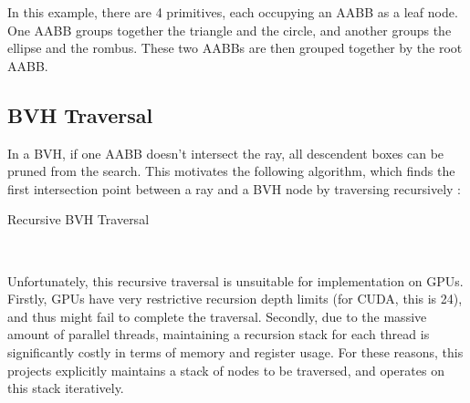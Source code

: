 In this example, there are 4 primitives, each occupying an AABB as a leaf node. One AABB groups together the triangle and the circle, and another groups the ellipse and the rombus. These two AABBs are then grouped together by the root AABB.


\subsection{BVH Traversal}
In a BVH, if one AABB doesn't intersect the ray, all descendent boxes can be pruned from the search. This motivates the following algorithm, which finds the first intersection point between a ray and a BVH node by traversing recursively :

\begin{algorithm}[H]
    \label{algo bvh traversal recursive}
    \caption{Recursive BVH Traversal}
\end{algorithm} 

~

Unfortunately, this recursive traversal is unsuitable for implementation on GPUs. Firstly, GPUs have very restrictive recursion depth limits (for CUDA, this is 24), and thus might fail to complete the traversal. Secondly, due to the massive amount of parallel threads, maintaining a recursion stack for each thread is significantly costly in terms of memory and register usage. For these reasons, this projects explicitly maintains a stack of nodes to be traversed, and operates on this stack iteratively.

